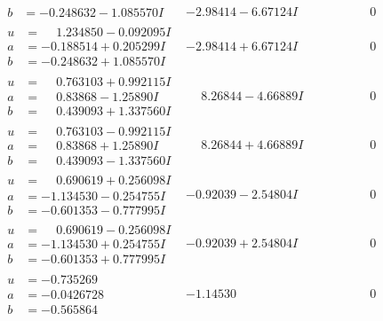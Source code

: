 \documentclass[1p]{elsarticle_modified}
\theoremstyle{definition}
\begin{document}
$$\begin{array}{c|c|c}
\begin{aligned}
b &= -0.248632 - 1.085570 I\end{aligned}
 & -2.98414 - 6.67124 I & \phantom{-0.000000 } 0 \\ \hline\begin{aligned}
u &= \phantom{-}1.234850 - 0.092095 I \\
a &= -0.188514 + 0.205299 I \\
b &= -0.248632 + 1.085570 I\end{aligned}
 & -2.98414 + 6.67124 I & \phantom{-0.000000 } 0 \\ \hline\begin{aligned}
u &= \phantom{-}0.763103 + 0.992115 I \\
a &= \phantom{-}0.83868 - 1.25890 I \\
b &= \phantom{-}0.439093 + 1.337560 I\end{aligned}
 & \phantom{-}8.26844 - 4.66889 I & \phantom{-0.000000 } 0 \\ \hline\begin{aligned}
u &= \phantom{-}0.763103 - 0.992115 I \\
a &= \phantom{-}0.83868 + 1.25890 I \\
b &= \phantom{-}0.439093 - 1.337560 I\end{aligned}
 & \phantom{-}8.26844 + 4.66889 I & \phantom{-0.000000 } 0 \\ \hline\begin{aligned}
u &= \phantom{-}0.690619 + 0.256098 I \\
a &= -1.134530 - 0.254755 I \\
b &= -0.601353 - 0.777995 I\end{aligned}
 & -0.92039 - 2.54804 I & \phantom{-0.000000 } 0 \\ \hline\begin{aligned}
u &= \phantom{-}0.690619 - 0.256098 I \\
a &= -1.134530 + 0.254755 I \\
b &= -0.601353 + 0.777995 I\end{aligned}
 & -0.92039 + 2.54804 I & \phantom{-0.000000 } 0 \\ \hline\begin{aligned}
u &= -0.735269\phantom{ +0.000000I} \\
a &= -0.0426728\phantom{ +0.000000I} \\
b &= -0.565864\phantom{ +0.000000I}\end{aligned}
 & -1.14530\phantom{ +0.000000I} & \phantom{-0.000000 } 0 \\ \hline\begin{aligned}

\end{aligned}
\end{array}$$
\end{document}

